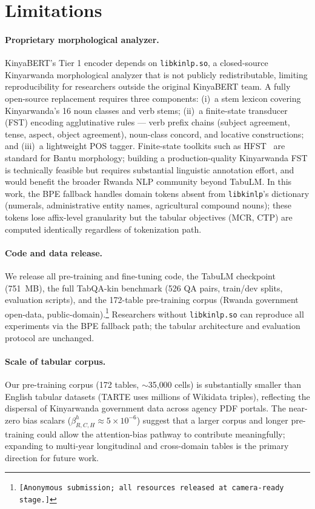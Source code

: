 \documentclass[11pt]{article}
\begin{document}
\section*{Limitations}
\label{sec:limitations}

\paragraph{Proprietary morphological analyzer.}
KinyaBERT's Tier 1 encoder depends on \texttt{libkinlp.so}, a closed-source Kinyarwanda morphological analyzer that is not publicly redistributable, limiting reproducibility for researchers outside the original KinyaBERT team.
A fully open-source replacement requires three components: (i)~a stem lexicon covering Kinyarwanda's 16 noun classes and verb stems; (ii)~a finite-state transducer (FST) encoding agglutinative rules --- verb prefix chains (subject agreement, tense, aspect, object agreement), noun-class concord, and locative constructions; and (iii)~a lightweight POS tagger.
Finite-state toolkits such as HFST~\citep{linden-etal-2011-hfst} are standard for Bantu morphology; building a production-quality Kinyarwanda FST is technically feasible but requires substantial linguistic annotation effort, and would benefit the broader Rwanda NLP community beyond TabuLM.
In this work, the BPE fallback handles domain tokens absent from \texttt{libkinlp}'s dictionary (numerals, administrative entity names, agricultural compound nouns); these tokens lose affix-level granularity but the tabular objectives (MCR, CTP) are computed identically regardless of tokenization path.

\paragraph{Code and data release.}
We release all pre-training and fine-tuning code, the TabuLM checkpoint (751~MB), the full TabQA-kin benchmark (526 QA pairs, train/dev splits, evaluation scripts), and the 172-table pre-training corpus (Rwanda government open-data, public-domain).\footnote{\texttt{[Anonymous submission; all resources released at camera-ready stage.]}}
Researchers without \texttt{libkinlp.so} can reproduce all experiments via the BPE fallback path; the tabular architecture and evaluation protocol are unchanged.

\paragraph{Scale of tabular corpus.}
Our pre-training corpus (172 tables, $\sim$35{,}000 cells) is substantially smaller than English tabular datasets (TARTE uses millions of Wikidata triples), reflecting the dispersal of Kinyarwanda government data across agency PDF portals.
The near-zero bias scalars ($\beta^h_{R,C,H} \approx 5\times10^{-6}$) suggest that a larger corpus and longer pre-training could allow the attention-bias pathway to contribute meaningfully; expanding to multi-year longitudinal and cross-domain tables is the primary direction for future work.
\end{document}
